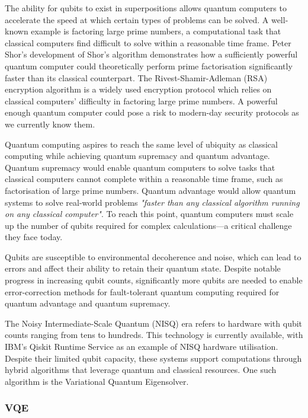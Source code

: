 \documentclass{article}
\begin{document}
{The ability for qubits to exist in superpositions allows quantum computers to accelerate the speed at which certain types of problems can be solved\cite{NielsenChuang2010}. A well-known example is factoring large prime numbers, a computational task that classical computers find difficult to solve within a reasonable time frame. Peter Shor’s development of Shor’s algorithm demonstrates how a sufficiently powerful quantum computer could theoretically perform prime factorisation significantly faster than its classical counterpart\cite{Shor_1997}\cite{minutephysics}. The Rivest-Shamir-Adleman (RSA) encryption algorithm is a widely used encryption protocol which relies on classical computers' difficulty in factoring large prime numbers\cite{encryptionconsulting}. A powerful enough quantum computer could pose a risk to modern-day security protocols as we currently know them. 

Quantum computing aspires to reach the same level of ubiquity as classical computing while achieving quantum supremacy and quantum advantage. Quantum supremacy would enable quantum computers to solve tasks that classical computers cannot complete within a reasonable time frame, such as factorisation of large prime numbers\cite{quera}. Quantum advantage would allow quantum systems to solve real-world problems \textit{"faster than any classical algorithm running on any classical computer"}\cite{quera}. To reach this point, quantum computers must scale up the number of qubits required for complex calculations—a critical challenge they face today.

Qubits are susceptible to environmental decoherence and noise, which can lead to errors and affect their ability to retain their quantum state\cite{Preskill2018}. Despite notable progress in increasing qubit counts, significantly more qubits are needed to enable error-correction methods for fault-tolerant quantum computing required for quantum advantage and quantum supremacy\cite{Willsch2022}.

The Noisy Intermediate-Scale Quantum (NISQ) era refers to hardware with qubit counts ranging from tens to hundreds\cite{Preskill2018}. This technology is currently available, with IBM's Qiskit Runtime Service as an example of NISQ hardware utilisation\cite{ReleaseSummary}. Despite their limited qubit capacity, these systems support computations through hybrid algorithms that leverage quantum and classical resources. One such algorithm is the Variational Quantum Eigensolver.

\subsubsection{VQE}

}
\end{document}
